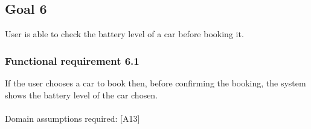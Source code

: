 \subsection{Goal 6}
User is able to check the battery level of a car before booking it.

\setcounter{secnumdepth}{3}
\subsubsection{Functional requirement 6.1}
If the user chooses a car to book then, before confirming the booking, the system shows the battery level of the car chosen.\\~\\
\noindent Domain assumptions required: [A13]
